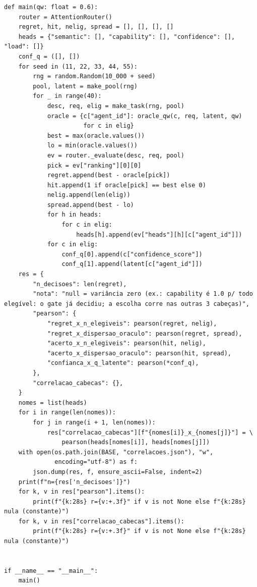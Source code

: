 \documentclass[12pt,openany,oneside,a4paper,brazil,chapter=TITLE]{abntex2}
\begin{document}
\begin{lstlisting}
def main(qw: float = 0.6):
    router = AttentionRouter()
    regret, hit, nelig, spread = [], [], [], []
    heads = {"semantic": [], "capability": [], "confidence": [], "load": []}
    conf_q = ([], [])
    for seed in (11, 22, 33, 44, 55):
        rng = random.Random(10_000 + seed)
        pool, latent = make_pool(rng)
        for _ in range(40):
            desc, req, elig = make_task(rng, pool)
            oracle = {c["agent_id"]: oracle_qw(c, req, latent, qw)
                      for c in elig}
            best = max(oracle.values())
            lo = min(oracle.values())
            ev = router._evaluate(desc, req, pool)
            pick = ev["ranking"][0][0]
            regret.append(best - oracle[pick])
            hit.append(1 if oracle[pick] == best else 0)
            nelig.append(len(elig))
            spread.append(best - lo)
            for h in heads:
                for c in elig:
                    heads[h].append(ev["heads"][h][c["agent_id"]])
            for c in elig:
                conf_q[0].append(c["confidence_score"])
                conf_q[1].append(latent[c["agent_id"]])
    res = {
        "n_decisoes": len(regret),
        "nota": "null = variância zero (ex.: capability é 1.0 p/ todo elegível: o gate já decidiu; a escolha corre nas outras 3 cabeças)",
        "pearson": {
            "regret_x_n_elegiveis": pearson(regret, nelig),
            "regret_x_dispersao_oraculo": pearson(regret, spread),
            "acerto_x_n_elegiveis": pearson(hit, nelig),
            "acerto_x_dispersao_oraculo": pearson(hit, spread),
            "confianca_x_q_latente": pearson(*conf_q),
        },
        "correlacao_cabecas": {},
    }
    nomes = list(heads)
    for i in range(len(nomes)):
        for j in range(i + 1, len(nomes)):
            res["correlacao_cabecas"][f"{nomes[i]}_x_{nomes[j]}"] = \
                pearson(heads[nomes[i]], heads[nomes[j]])
    with open(os.path.join(BASE, "correlacoes.json"), "w",
              encoding="utf-8") as f:
        json.dump(res, f, ensure_ascii=False, indent=2)
    print(f"n={res['n_decisoes']}")
    for k, v in res["pearson"].items():
        print(f"{k:28s} r={v:+.3f}" if v is not None else f"{k:28s} nula (constante)")
    for k, v in res["correlacao_cabecas"].items():
        print(f"{k:28s} r={v:+.3f}" if v is not None else f"{k:28s} nula (constante)")


if __name__ == "__main__":
    main()
\end{lstlisting}
\end{document}

